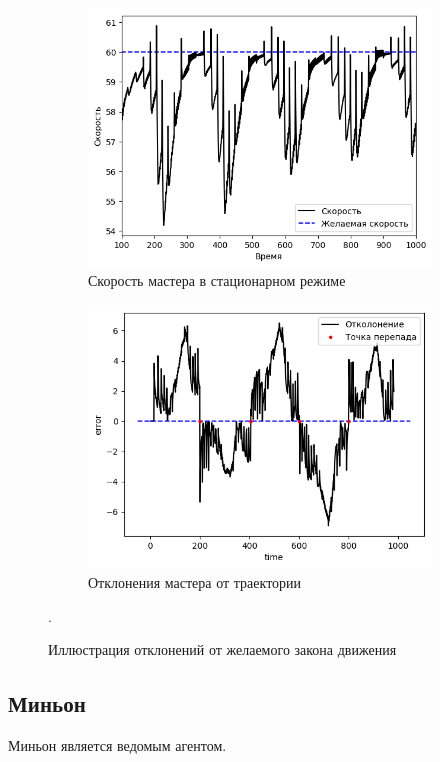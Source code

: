 \documentclass[12pt,a4paper]{article}
\begin{document}
\begin{figure}[!htbp]
	\centering
	\begin{subfigure}{.5\textwidth}
		\centering
		\includegraphics[width=1\linewidth]{master-trajectory-1-velocity.png}
		\caption{Скорость мастера в стационарном режиме}
		\label{fig:error-master-1}
	\end{subfigure}%
	\begin{subfigure}{.5\textwidth}
		\centering
		\includegraphics[width=1\linewidth]{master-trajectory-error.png}
		\caption{Отклонения мастера от траектории}
		\label{fig:error-master-2}
	\end{subfigure}
	\caption{Иллюстрация отклонений от желаемого закона движения}.
	\label{fig:errors-master}
\end{figure}

\subsection{Миньон}
Миньон является ведомым агентом.  
\end{document}
